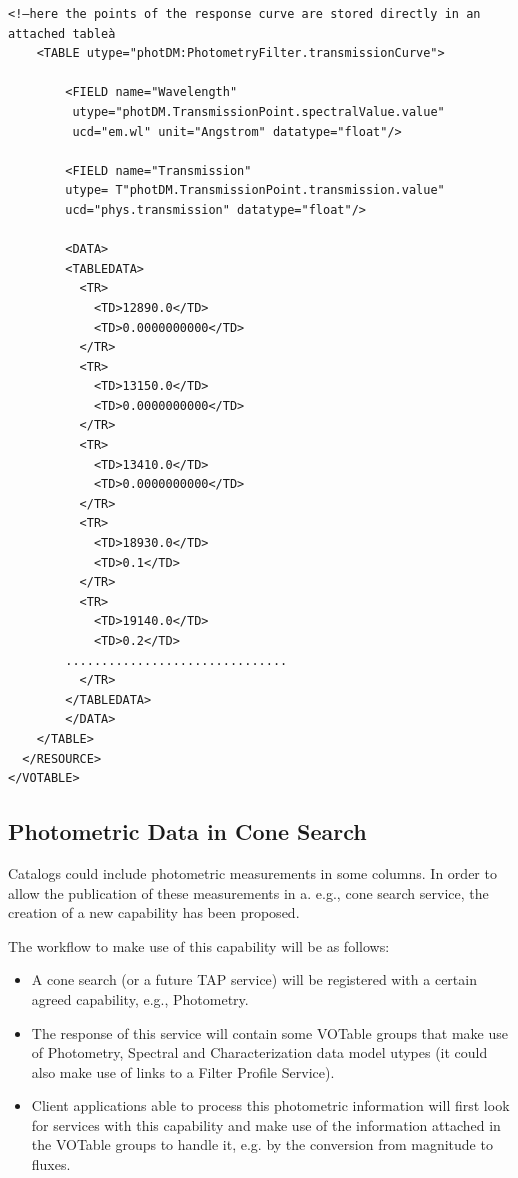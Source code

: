 \documentclass[11pt,a4paper]{ivoa}
\begin{document}
\begin{appendices}
\begin{verbatim}
<!—here the points of the response curve are stored directly in an attached tableà
    <TABLE utype="photDM:PhotometryFilter.transmissionCurve">

        <FIELD name="Wavelength"
         utype="photDM.TransmissionPoint.spectralValue.value"
         ucd="em.wl" unit="Angstrom" datatype="float"/>

        <FIELD name="Transmission"
        utype= T"photDM.TransmissionPoint.transmission.value"
        ucd="phys.transmission" datatype="float"/>

        <DATA>
        <TABLEDATA>
          <TR>
            <TD>12890.0</TD>
            <TD>0.0000000000</TD>
          </TR>
          <TR>
            <TD>13150.0</TD>
            <TD>0.0000000000</TD>
          </TR>
          <TR>
            <TD>13410.0</TD>
            <TD>0.0000000000</TD>
          </TR>
          <TR>
            <TD>18930.0</TD>
            <TD>0.1</TD>
          </TR>
          <TR>
            <TD>19140.0</TD>
            <TD>0.2</TD>
        ...............................
          </TR>
        </TABLEDATA>
        </DATA>
    </TABLE>
  </RESOURCE>
</VOTABLE>

\end{verbatim}


\subsection{Photometric Data in Cone Search}
Catalogs could include photometric measurements in some columns. In order to allow the publication of these measurements in a. e.g., cone search service, the creation of a new capability has been proposed.
\par

The workflow to make use of this capability will be as follows:
\par

\begin{itemize}
	\item A cone search (or a future TAP service) will be registered with a certain agreed capability, e.g., Photometry.\par

	\item The response of this service will contain some VOTable groups that make use of Photometry, Spectral and Characterization data model utypes (it could also make use of links to a Filter Profile Service).\par

	\item Client applications able to process this photometric information will first look for services with this capability and make use of the information attached in the VOTable groups to handle it, e.g. by the conversion from magnitude to fluxes.
\end{itemize}\par


\end{appendices}
\end{document}
